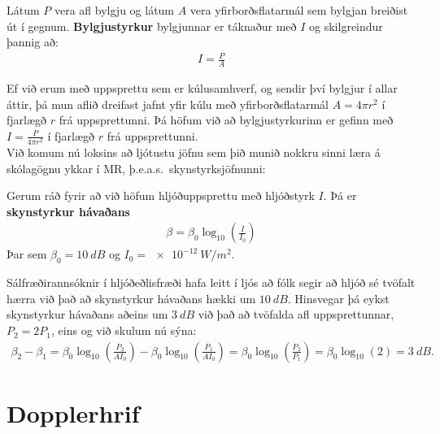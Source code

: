 \ifdefined \wholebook \else\documentclass[oneside]{book}\usepackage{EdlBook}\graphicspath{{figures/}}
\begin{document}
\begin{tcolorbox}
\begin{definition}
Látum $P$ vera afl bylgju og látum $A$ vera yfirborðsflatarmál sem bylgjan breiðist út í gegnum. \textbf{Bylgjustyrkur} bylgjunnar er táknaður með $I$ og skilgreindur þannig að:
\begin{align*}
    I = \frac{P}{A}
\end{align*}
\end{definition}
\end{tcolorbox}

Ef við erum með uppsprettu sem er kúlusamhverf, og sendir því bylgjur í allar áttir, þá mun aflið dreifast jafnt yfir kúlu með yfirborðsflatarmál $A = 4\pi r^2$ í fjarlægð $r$ frá uppsprettunni. Þá höfum við að bylgjustyrkurinn er gefinn með $I = \frac{P}{4\pi r^2}$ í fjarlægð $r$ frá uppsprettunni. \\

Við komum nú loksins að ljótustu jöfnu sem þið munið nokkru sinni læra á skólagögnu ykkar í MR, þ.e.a.s.~skynstyrksjöfnunni:

\begin{tcolorbox}
\begin{definition}
Gerum ráð fyrir að við höfum hljóðuppsprettu með hljóðstyrk $I$. Þá er \textbf{skynstyrkur hávaðans}
\begin{align*}
    \beta = \beta_0 \log_{10}\left(\frac{I}{I_0}\right)
\end{align*}
Þar sem $\beta_0 = \SI{10}{dB}$ og $I_0 = \SI{e-12}{W/m^2}$.
\end{definition}
\end{tcolorbox}


Sálfræðirannsóknir í hljóðeðlisfræði hafa leitt í ljós að fólk segir að hljóð sé tvöfalt hærra við það að skynstyrkur hávaðans hækki um $\SI{10}{dB}$. Hinsvegar þá eykst skynstyrkur hávaðans aðeins um $\SI{3}{dB}$ við það að tvöfalda afl uppsprettunnar, $P_2 = 2P_1$, eins og við skulum nú sýna:
\begin{align*}
    \beta_2 - \beta_1 = \beta_0 \log_{10}\left( \frac{P_2}{A I_0} \right) - \beta_0 \log_{10}\left( \frac{P_1}{A I_0} \right) = \beta_0 \log_{10}\left( \frac{P_2}{P_1} \right) = \beta_0 \log_{10}(2) = \SI{3}{dB}.
\end{align*}

\section{Dopplerhrif}
\end{document}
